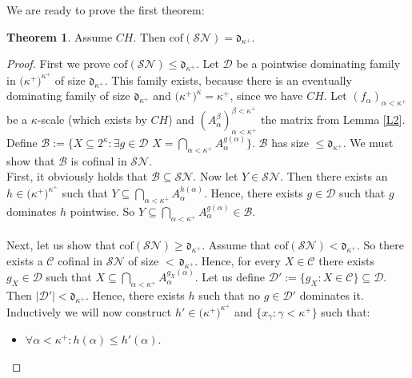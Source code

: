 \documentclass[12pt,a4paper]{scrartcl}
\theoremstyle{definition}
\newtheorem{theorem}[definition]{Theorem}
\numberwithin{equation}{section}
\begin{document}
We are ready to prove the first theorem:

\begin{theorem} \label{T1}
Assume $CH$. Then $\text{cof}(\mathcal{SN})= \mathfrak{d}_{\kappa^+}$.
\end{theorem}

\begin{proof}
First we prove $\text{cof}(\mathcal{SN})\leq \mathfrak{d}_{\kappa^+}$. Let $\mathcal{D}$ be a pointwise dominating family in $\big ({\kappa^+} \big)^{\kappa^+}$ of size $\mathfrak{d}_{\kappa^+}$. This family exists, because there is an eventually dominating family of size $ \mathfrak{d}_{\kappa^+}$ and $\big ({\kappa^+} \big )^{\kappa} = \kappa^+$, since we have $CH$. Let $(f_\alpha)_{\alpha< \kappa^+}$ be a $\kappa$-scale (which exists by $CH$) and $(A_\alpha^\beta)_{\alpha< \kappa^+}^{\beta<\kappa^+}$ the matrix from Lemma \ref{L2}. Define $\mathcal{B}:=\{ X \subseteq 2^\kappa \colon \exists g \in \mathcal{D} \,\, X=\bigcap_{\alpha<\kappa^+} A_\alpha^{g(\alpha)} \}$. $\mathcal{B}$ has size $\leq\mathfrak{d}_{\kappa^+}$. We must show that $\mathcal{B}$ is cofinal in $\mathcal{SN}$. \\
First, it obviously holds that $\mathcal{B} \subseteq \mathcal{SN}$. Now let $Y \in \mathcal{SN}$. Then there exists an $h \in \big ({\kappa^+} \big)^{\kappa^+}$ such that $Y \subseteq \bigcap_{\alpha < \kappa^+} A_\alpha^{h(\alpha)}$. Hence, there exists $g\in \mathcal{D}$ such that $g$ dominates $h$ pointwise. So $Y \subseteq \bigcap_{\alpha < \kappa^+} A_\alpha^{g(\alpha)} \in  \mathcal{B}$.\\
\\
Next, let us show that $\text{cof}(\mathcal{SN})\geq \mathfrak{d}_{\kappa^+}$. Assume that $\text{cof}(\mathcal{SN})<\mathfrak{d}_{\kappa^+}$. So there exists a $\mathcal{C}$ cofinal in $\mathcal{SN}$ of size ${<} \,\mathfrak{d}_{\kappa^+}$. Hence, for every $X \in \mathcal{C}$ there exists $g_X \in \mathcal{D}$ such that $X \subseteq \bigcap_{\alpha < \kappa^+} A_\alpha^{g_X(\alpha)}$. Let us define $\mathcal{D}':=\{g_X \colon X \in \mathcal{C}\} \subseteq \mathcal{D}$. Then $\vert \mathcal{D}' \vert < \mathfrak{d}_{\kappa^+}$. Hence, there exists $h$ such that no $g \in \mathcal{D}'$ dominates it.\\
Inductively we will now construct $h'\in \big ({\kappa^+} \big)^{\kappa^+}$ and $\{x_\gamma \colon \gamma < \kappa^+\}$ such that:
\begin{itemize}
\item $\forall \alpha < \kappa^+ \colon h(\alpha) \leq h'(\alpha)$.

\end{itemize}
\end{proof}
\end{document}
